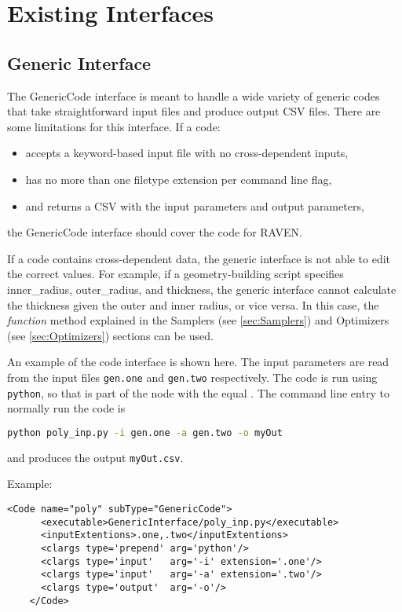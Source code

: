 \section{Existing Interfaces}
\label{sec:existingInterface}
\subsection{Generic Interface}
\label{subsec:genericInterface}
The GenericCode interface is meant to handle a wide variety of generic codes
that take straightforward input files and produce output CSV files.  There are
some limitations for this interface.
If a code: \vspace{-20pt}
\begin{itemize}
\item accepts a keyword-based input file with no cross-dependent inputs,
\item has no more than one filetype extension per command line flag,
\item and returns a CSV with the input parameters and output parameters,
\end{itemize}\vspace{-20pt}
the GenericCode interface should cover the code for RAVEN.

If a code contains cross-dependent data, the generic interface is not able to
edit the correct values.  For example, if a geometry-building script specifies
inner\_radius, outer\_radius, and thickness, the generic interface cannot
calculate the thickness given the outer and inner radius, or vice versa.
In this case, the \textit{function} method explained in the Samplers (see \ref{sec:Samplers})
and Optimizers (see \ref{sec:Optimizers}) sections can be used.

 An example of the code interface is shown here.  The input parameters are read
 from the input files \texttt{gen.one} and \texttt{gen.two} respectively.
 The code is run using \texttt{python}, so that is part of the  node with the  equal .
 The command line entry to normally run the code is
\begin{lstlisting}[language=bash]
python poly_inp.py -i gen.one -a gen.two -o myOut
\end{lstlisting}
and produces the output \texttt{myOut.csv}.

Example:
\begin{lstlisting}[style=XML]
    <Code name="poly" subType="GenericCode">
      <executable>GenericInterface/poly_inp.py</executable>
      <inputExtentions>.one,.two</inputExtentions>
      <clargs type='prepend' arg='python'/>
      <clargs type='input'   arg='-i' extension='.one'/>
      <clargs type='input'   arg='-a' extension='.two'/>
      <clargs type='output'  arg='-o'/>
    </Code>
\end{lstlisting}


